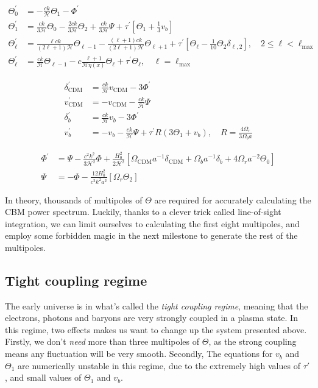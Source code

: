 \documentclass[10pt, a4paper]{article}
\begin{document}
\begin{align}
    \label{eqn:ODEstart}
    \Theta_{0}^{\prime} &= -\frac{c k}{\mathcal{H}} \Theta_{1}-\Phi^{\prime}\\
    \Theta_{1}^{\prime} &= \frac{c k}{3 \mathcal{H}} \Theta_{0}-\frac{2 c k}{3 \mathcal{H}} \Theta_{2}+\frac{c k}{3 \mathcal{H}} \Psi+\tau^{\prime}\left[\Theta_{1}+\frac{1}{3} v_{b}\right] \\
    \Theta_{\ell}^{\prime} &= \frac{\ell c k}{(2 \ell+1) \mathcal{H}} \Theta_{\ell-1}-\frac{(\ell+1) c k}{(2 \ell+1) \mathcal{H}} \Theta_{\ell+1}+\tau^{\prime}\left[\Theta_{\ell}-\frac{1}{10} \Theta_2 \delta_{\ell, 2}\right], \quad 2 \leq \ell<\ell_{\max } \\
    \Theta_{\ell}^{\prime} &= \frac{c k}{\mathcal{H}} \Theta_{\ell-1}-c \frac{\ell+1}{\mathcal{H} \eta(x)} \Theta_{\ell}+\tau^{\prime} \Theta_{\ell}, \quad \ell=\ell_{\max }
\end{align}


\begin{align}
    \delta_{\mathrm{CDM}}^{\prime} &=\frac{c k}{\mathcal{H}} v_{\mathrm{CDM}}-3 \Phi^{\prime} \\
    v_{\mathrm{CDM}}^{\prime} &=-v_{\mathrm{CDM}}-\frac{c k}{\mathcal{H}} \Psi \\
    \delta_{b}^{\prime} &=\frac{c k}{\mathcal{H}} v_{b}-3 \Phi^{\prime} \\
    v_{b}^{\prime} &=-v_{b}-\frac{c k}{\mathcal{H}} \Psi+\tau^{\prime} R\left(3 \Theta_{1}+v_{b}\right), \quad R = \frac{4\Omega_r}{3\Omega_b a}
\end{align}

\begin{align}
    \label{eqn:ODEstop}
    \Phi^{\prime} &=\Psi-\frac{c^{2} k^{2}}{3 \mathcal{H}^{2}} \Phi+\frac{H_{0}^{2}}{2 \mathcal{H}^{2}}\left[\Omega_{\mathrm{CDM}} a^{-1} \delta_{\mathrm{CDM}}+\Omega_{b} a^{-1} \delta_{b}+4 \Omega_{r} a^{-2} \Theta_{0}\right] \\
    \label{eqn:Psi}
    \Psi &=-\Phi-\frac{12 H_{0}^{2}}{c^{2} k^{2} a^{2}}\left[\Omega_{r} \Theta_{2}\right]
\end{align}

In theory, thousands of multipoles of $\Theta$ are required for accurately calculating the CBM power spectrum. Luckily, thanks to a clever trick called line-of-sight integration, we can limit ourselves to calculating the first eight multipoles, and employ some forbidden magic in the next milestone to generate the rest of the multipoles.


\subsection{Tight coupling regime}
The early universe is in what's called the \textit{tight coupling regime}, meaning that the electrons, photons and baryons are very strongly coupled in a plasma state. In this regime, two effects makes us want to change up the system presented above. Firstly, we don't \textit{need} more than three multipoles of $\Theta$, as the strong coupling means any fluctuation will be very smooth. Secondly, The equations for $v_b$ and $\Theta_1$ are numerically unstable in this regime, due to the extremely high values of $\tau'$, and small values of $\Theta_1$ and $v_b$.
\end{document}
